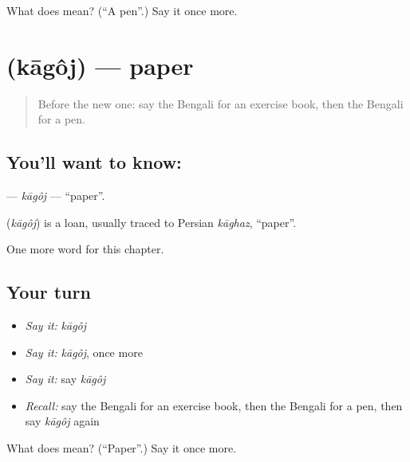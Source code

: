 \begin{tcolorbox}[breakable,colback=teal!4,colframe=teal!35!black,title={Before you move on}]
What does  mean? (\textquotedblleft{}A pen\textquotedblright{}.) Say it once more.
\end{tcolorbox}
\section[\texorpdfstring{\bn{কাগজ} (kāgôj)}{কাগজ (kāgôj)}]{ (kāgôj) — paper}

\label{lesson:BN-C64-kagoj}



\begin{quote}
Before the new one: say the Bengali for an exercise book, then the Bengali for a pen.
\end{quote}

\subsection*{You'll want to know: }
\textbf{} — \emph{kāgôj} — \textquotedblleft{}paper\textquotedblright{}.

\begin{cousinweb}
\textbf{} (\emph{kāgôj}) is a loan, usually traced to Persian \emph{kāghaz}, \textquotedblleft{}paper\textquotedblright{}.
\end{cousinweb}

\begin{grammarlens}[title={What you've built}]
One more word for this chapter.
\end{grammarlens}

\subsection*{Your turn}
\begin{itemize}
\raggedright
  \item \emph{Say it:} \emph{kāgôj}
  \item \emph{Say it:} \emph{kāgôj}, once more
  \item \emph{Say it:} say \emph{kāgôj}
  \item \emph{Recall:} say the Bengali for an exercise book, then the Bengali for a pen, then say \emph{kāgôj} again
\end{itemize}

\begin{tcolorbox}[breakable,colback=teal!4,colframe=teal!35!black,title={Before you move on}]
What does  mean? (\textquotedblleft{}Paper\textquotedblright{}.) Say it once more.
\end{tcolorbox}
